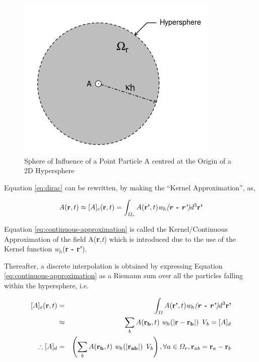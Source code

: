 \begin{figure}[htb!]
\centering
\setlength\fboxsep{0pt}
      \includegraphics[scale=0.6]{figures/SpInfContinuous_R.png}
\caption{{\small{Sphere of Influence of a Point Particle A centred at the Origin of a 2D Hypersphere}}}
\label{fig:sphere_influence}
\end{figure}
\newpage
Equation \eqref{eq:dirac} can be rewritten, by making the ``Kernel Approximation'',  as,

\begin{eqnarray} \label{eq:continuous-approximation}
 A(\textbf{r},t) \approx [A]_{c}(\textbf{r},t)= \int_{\varOmega_r} A(\textbf{r'},t) \textit{w$_h$(\textbf{r - r'})} d^{3}\textbf{r'}
\end{eqnarray}

Equation \eqref{eq:continuous-approximation} is called the Kernel/Continuous Approximation of the field A(\textbf{r},\textit{t}) which is introduced due to the use of the Kernel function \textit{w$_h$}(\textbf{r - r'}).

Thereafter, a discrete interpolation is obtained by expressing Equation \ref{eq:continuous-approximation} as a Riemann sum over all the particles falling within the hypersphere, i.e.

\begin{eqnarray} \label{eq:particle-approximation}
     [A]_{c}(\textbf{r},t) &=& \int_{\varOmega} A(\textbf{r'},t) \textit{w$_h$(\textbf{r - r'})} d^{3}\textbf{r'} \nonumber \\
     &\approx & \sum_{b}A(\textbf{$\bf{r}_b$},t)~\textit{w$_h$}(\textbf{$|\bf{r}-\bf{r}_b |$}) ~ \textit{V$_b$} = [A]_{d} \nonumber \\
     \therefore [A]_{d} &=& \left( \sum_{b}A(\textbf{$\bf{r}_b$},t)~\textit{w$_h$}(\textbf{$|\bf{r}_{ab} |$}) ~ \textit{V$_b$}\right) ,
     \forall a \in  \varOmega_r , \textbf{r}_{ab} = \textbf{r}_{a} - \textbf{r}_{b}
\end{eqnarray}


